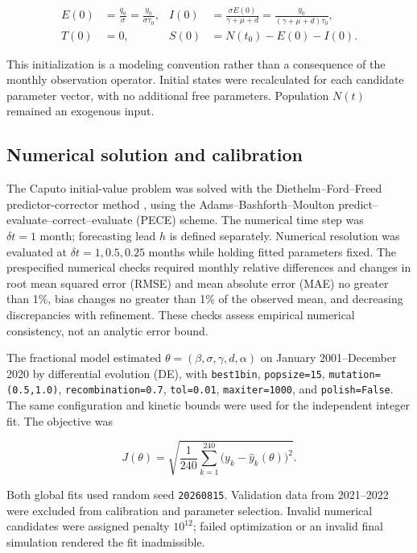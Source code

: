 \documentclass[pdflatex,sn-mathphys-ay]{sn-jnl}
\begin{document}
\[
\begin{aligned}
E(0)&=\frac{q_0}{\sigma}=\frac{y_0}{\sigma\tau_0}, &
I(0)&=\frac{\sigma E(0)}{\gamma+\mu+d}=\frac{y_0}{(\gamma+\mu+d)\tau_0},\\
T(0)&=0, & S(0)&=N(t_0)-E(0)-I(0).
\end{aligned}
\]

This initialization is a modeling convention rather than a consequence of the monthly observation operator. Initial states were recalculated for each candidate parameter vector, with no additional free parameters. Population $N(t)$ remained an exogenous input.

\subsection{Numerical solution and calibration}

The Caputo initial-value problem was solved with the Diethelm--Ford--Freed predictor-corrector method \citep{diethelm2002}, using the Adams--Bashforth--Moulton predict--evaluate--correct--evaluate (PECE) scheme. The numerical time step was $\delta t=1\text{ month}$; forecasting lead $h$ is defined separately. Numerical resolution was evaluated at $\delta t=1,0.5,0.25$ months while holding fitted parameters fixed. The prespecified numerical checks required monthly relative differences and changes in root mean squared error (RMSE) and mean absolute error (MAE) no greater than 1\%, bias changes no greater than 1\% of the observed mean, and decreasing discrepancies with refinement. These checks assess empirical numerical consistency, not an analytic error bound.

The fractional model estimated $\theta=(\beta,\sigma,\gamma,d,\alpha)$ on January 2001--December 2020 by differential evolution (DE), with \texttt{best1bin}, \texttt{popsize=15}, \texttt{mutation=(0.5,1.0)}, \texttt{recombination=0.7}, \texttt{tol=0.01}, \texttt{maxiter=1000}, and \texttt{polish=False}. The same configuration and kinetic bounds were used for the independent integer fit. The objective was

\[
J(\theta)=\sqrt{\frac{1}{240}\sum_{k=1}^{240}\bigl(y_k-\widehat y_k(\theta)\bigr)^2}.
\]

Both global fits used random seed \texttt{20260815}. Validation data from 2021--2022 were excluded from calibration and parameter selection. Invalid numerical candidates were assigned penalty $10^{12}$; failed optimization or an invalid final simulation rendered the fit inadmissible.
\end{document}
